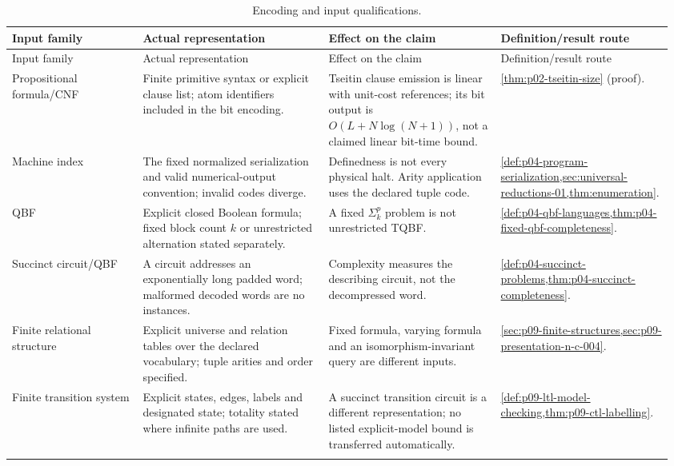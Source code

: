 \begin{landscape}
\begingroup\small\setlength{\tabcolsep}{3pt}
\begin{longtable}{@{}p{0.19\linewidth}p{0.27\linewidth}p{0.25\linewidth}p{0.25\linewidth}@{}}
\caption{Encoding and input qualifications.}\label{tab:p14-dc-encoding}\\
\toprule
Input family & Actual representation & Effect on the claim & Definition/result route\\\midrule
\endfirsthead
\toprule
Input family & Actual representation & Effect on the claim & Definition/result route\\\midrule
\endhead
\bottomrule
\endfoot
Propositional formula/CNF & Finite primitive syntax or explicit clause list; atom identifiers included in the bit encoding. & Tseitin clause emission is linear with unit-cost references; its bit output is \(O(L+N\log(N+1))\), not a claimed linear bit-time bound. & \cref{thm:p02-tseitin-size} (proof).\\\addlinespace
Machine index & The fixed normalized serialization and valid numerical-output convention; invalid codes diverge. & Definedness is not every physical halt. Arity application uses the declared tuple code. & \cref{def:p04-program-serialization,sec:universal-reductions-01,thm:enumeration}.\\\addlinespace
QBF & Explicit closed Boolean formula; fixed block count \(k\) or unrestricted alternation stated separately. & A fixed \(\Sigma_k^p\) problem is not unrestricted TQBF. & \cref{def:p04-qbf-languages,thm:p04-fixed-qbf-completeness}.\\\addlinespace
Succinct circuit/QBF & A circuit addresses an exponentially long padded word; malformed decoded words are no instances. & Complexity measures the describing circuit, not the decompressed word. & \cref{def:p04-succinct-problems,thm:p04-succinct-completeness}.\\\addlinespace
Finite relational structure & Explicit universe and relation tables over the declared vocabulary; tuple arities and order specified. & Fixed formula, varying formula and an isomorphism-invariant query are different inputs. & \cref{sec:p09-finite-structures,sec:p09-presentation-n-c-004}.\\\addlinespace
Finite transition system & Explicit states, edges, labels and designated state; totality stated where infinite paths are used. & A succinct transition circuit is a different representation; no listed explicit-model bound is transferred automatically. & \cref{def:p09-ltl-model-checking,thm:p09-ctl-labelling}.\\\addlinespace

\end{longtable}
\end{landscape}
